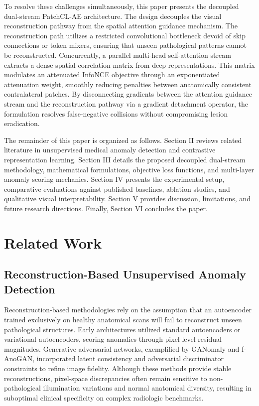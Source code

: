 \documentclass[journal]{IEEEtran}
\begin{document}
To resolve these challenges simultaneously, this paper presents the decoupled dual-stream PatchCL-AE architecture. The design decouples the visual reconstruction pathway from the spatial attention guidance mechanism. The reconstruction path utilizes a restricted convolutional bottleneck devoid of skip connections or token mixers, ensuring that unseen pathological patterns cannot be reconstructed. Concurrently, a parallel multi-head self-attention stream extracts a dense spatial correlation matrix from deep representations. This matrix modulates an attenuated InfoNCE objective through an exponentiated attenuation weight, smoothly reducing penalties between anatomically consistent contralateral patches. By disconnecting gradients between the attention guidance stream and the reconstruction pathway via a gradient detachment operator, the formulation resolves false-negative collisions without compromising lesion eradication.

The remainder of this paper is organized as follows. Section II reviews related literature in unsupervised medical anomaly detection and contrastive representation learning. Section III details the proposed decoupled dual-stream methodology, mathematical formulations, objective loss functions, and multi-layer anomaly scoring mechanics. Section IV presents the experimental setup, comparative evaluations against published baselines, ablation studies, and qualitative visual interpretability. Section V provides discussion, limitations, and future research directions. Finally, Section VI concludes the paper.

\section{Related Work}
\subsection{Reconstruction-Based Unsupervised Anomaly Detection}
Reconstruction-based methodologies rely on the assumption that an autoencoder trained exclusively on healthy anatomical scans will fail to reconstruct unseen pathological structures. Early architectures utilized standard autoencoders or variational autoencoders, scoring anomalies through pixel-level residual magnitudes. Generative adversarial networks, exemplified by GANomaly and f-AnoGAN, incorporated latent consistency and adversarial discriminator constraints to refine image fidelity. Although these methods provide stable reconstructions, pixel-space discrepancies often remain sensitive to non-pathological illumination variations and normal anatomical diversity, resulting in suboptimal clinical specificity on complex radiologic benchmarks.
\end{document}
